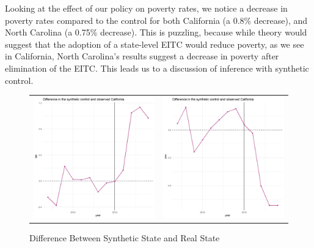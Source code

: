 \documentclass{article}
\begin{document}
Looking at the effect of our policy on poverty rates, we notice a decrease in poverty rates compared to the control for both California (a 0.8\% decrease), and North Carolina (a 0.75\% decrease). This is puzzling, because while theory would suggest that the adoption of a state-level EITC would reduce poverty, as we see in California, North Carolina's results suggest a decrease in poverty after elimination of the EITC. This leads us to a discussion of inference with synthetic control.  

\restoregeometry


\begin{figure}
\begin{center}
\caption{Difference Between Synthetic State and Real State}
\label{fig:diff}{}
\begin{tabular}{cc}
 \includegraphics[width=80mm]{ca_lab_diff} &   \includegraphics[width=80mm]{ca_pov_diff} \\

\end{tabular}
\end{center}
\end{figure}
\end{document}
